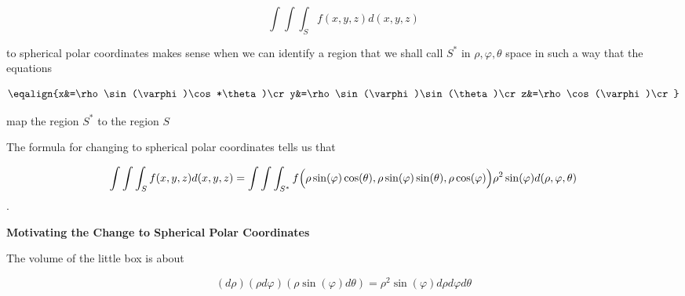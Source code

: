 $$\int\int\int_Sf(x,y,z)d(x,y,z)$$

\vskip 1mm
to spherical polar coordinates makes sense when we can identify a region that we shall call $S^*$ in $\rho,\varphi,\theta$ space in such a way that the equations

$$\eqalign{x&=\rho\sin(\varphi)\cos*\theta)\cr
		y&=\rho\sin(\varphi)\sin(\theta)\cr
		z&=\rho\cos(\varphi)\cr}$$

map the region $S^*$ to the region $S$

\vskip 1mm
The formula for changing to spherical polar coordinates tells us that

$$\int\int\int_Sf(x,y,z)d(x,y,z)=\int\int\int_{S^*}f\Bigl(\rho\sin(\varphi)\cos(\theta),\rho\sin(\varphi)\sin(\theta),\rho\cos(\varphi)\Bigr)\rho^2\sin(\varphi)d(\rho,\varphi,\theta)$$.

\filbreak
\vskip 1cm
{\bf Motivating the Change to Spherical Polar Coordinates}

\vskip 1mm
The volume of the little box is about

$$(d\rho)(\rho d\varphi)(\rho\sin(\varphi) d\theta)=\rho^2\sin(\varphi)d\rho d\varphi d\theta$$



\vfill\eject
\bye
